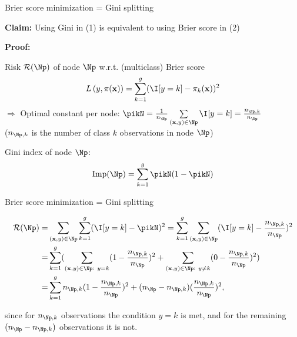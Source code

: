 \documentclass[11pt,compress,t,notes=noshow, xcolor=table]{beamer}
\begin{document}
\begin{frame}{Brier score minimization = Gini splitting}

\textbf{Claim:} Using Gini in (1) 
is equivalent to using Brier score in (2) %

\textbf{Proof:} 

Risk $\risk(\Np)$ of node $\Np$ w.r.t. (multiclass) Brier score
$$
\Lpixy = \sum_{k = 1}^g (\I [y=k] - \pi_k(\xv))^2
$$
$\Rightarrow$ Optimal constant per node: $\pikN = \frac{1}{n_{\Np}} \sum\limits_{(\xv,y) \in \Np} \I [y=k] = \frac{n_{\Np,k}}{n_{\Np }}$ \\ ($n_{\Np,k}$ is the number of class $k$ observations in node $\Np$) \\

\vfill

Gini index of node $\Np$:
$$
\text{Imp}(\Np) = \sum_{k=1}^g \pikN (1-\pikN ) %
$$


\end{frame}
\begin{frame2}[small]{Brier score minimization = Gini splitting}

\begin{align*}
\risk(\Np) =& \sum_{\xy \in \Np}  \sum_{k = 1}^g (\I [y=k] - \pikN)^2 
= \sum_{k = 1}^g \sum_{\xy \in \Np} (\I [y=k] - \frac{n_{\Np,k}}{n_{\Np }})^2\\
=& \sum_{k = 1}^{g} (\sum_{\xy \in \Np: ~ y = k} (1 - \frac{n_{\Np,k}}{n_{\Np }})^2 + \sum_{\xy \in \Np: ~ y \ne k} (0 - \frac{n_{\Np,k}}{n_{\Np }})^2) \\
=& \sum_{k = 1}^g n_{\Np,k}(1 - \frac{n_{\Np,k}}{n_{\Np }})^2 + (n_{\Np } - n_{\Np,k})(\frac{n_{\Np,k}}{n_{\Np }})^2, 
\end{align*}

\vfill

since for $n_{\Np,k}$ observations the condition $y = k$ is met, and for the remaining $(n_\Np - n_{\Np,k})$ observations it is not. 

\end{frame2}
\end{document}
